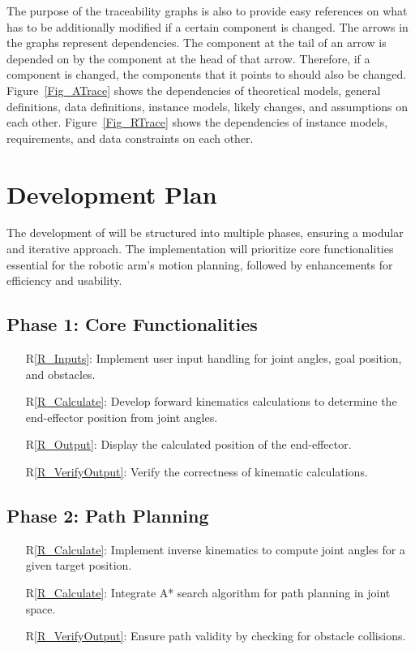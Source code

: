 \documentclass[12pt]{article}
\begin{document}
  

The purpose of the traceability graphs is also to provide easy references on
what has to be additionally modified if a certain component is changed.  The
arrows in the graphs represent dependencies. The component at the tail of an
arrow is depended on by the component at the head of that arrow. Therefore, if a
component is changed, the components that it points to should also be
changed. Figure~\ref{Fig_ATrace} shows the dependencies of theoretical models,
general definitions, data definitions, instance models, likely changes, and
assumptions on each other. Figure~\ref{Fig_RTrace} shows the dependencies of
instance models, requirements, and data constraints on each other.



\section{Development Plan}

The development of \progname{} will be structured into multiple phases, ensuring a modular and iterative approach. The implementation will prioritize core functionalities essential for the robotic arm's motion planning, followed by enhancements for efficiency and usability.

\subsection{Phase 1: Core Functionalities}
\begin{itemize}
    \item[R\ref{R_Inputs}:] Implement user input handling for joint angles, goal position, and obstacles.
    \item[R\ref{R_Calculate}:] Develop forward kinematics calculations to determine the end-effector position from joint angles.
    \item[R\ref{R_Output}:] Display the calculated position of the end-effector.
    \item[R\ref{R_VerifyOutput}:] Verify the correctness of kinematic calculations.
\end{itemize}

\subsection{Phase 2: Path Planning}
\begin{itemize}
    \item[R\ref{R_Calculate}:] Implement inverse kinematics to compute joint angles for a given target position.
    \item[R\ref{R_Calculate}:] Integrate A* search algorithm for path planning in joint space.
    \item[R\ref{R_VerifyOutput}:] Ensure path validity by checking for obstacle collisions.
\end{itemize}
\end{document}
